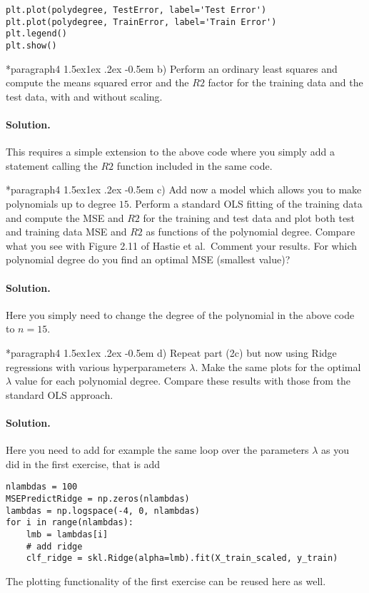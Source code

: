 \documentclass[%
oneside,                 %
final,                   %
10pt]{article}
\makeatletter
\newenvironment{doconceexercise}{}{}
\newcommand\subex{\@startsection*{paragraph}{4}{\z@}%
                  {1.5ex\@plus1ex \@minus.2ex}%
                  {-0.5em}%
                  {\normalfont\normalsize\bfseries}}
\makeatother
\begin{document}
\begin{doconceexercise}
\begin{verbatim}
plt.plot(polydegree, TestError, label='Test Error')
plt.plot(polydegree, TrainError, label='Train Error')
plt.legend()
plt.show()
\end{verbatim}


\subex{b)}
Perform an ordinary least squares and compute the means squared error and the $R2$ factor for the training data and the test data, with and without scaling.


\paragraph{Solution.}
This requires a simple extension to the above code where you simply add a statement calling the $R2$ function included in the same code.


\subex{c)}
Add now a model which allows you to make polynomials up to degree $15$.  Perform a standard OLS fitting of the training data and compute the MSE and $R2$ for the training and test data and plot both test and training data MSE and $R2$ as functions of the polynomial degree. Compare what you see with Figure 2.11 of Hastie et al.~Comment your results. For which polynomial degree do you find an optimal MSE (smallest value)?


\paragraph{Solution.}
Here you simply need to change the degree of the polynomial in the above code to $n=15$.


\subex{d)}
Repeat part (2c) but now using Ridge regressions with various hyperparameters $\lambda$. Make the same plots for the optimal $\lambda$ value for each polynomial degree. Compare these results with those from the standard OLS approach.


\paragraph{Solution.}
Here you need to add for example the same loop over the parameters $\lambda$ as you did in the first exercise, that is add
\begin{verbatim}
nlambdas = 100
MSEPredictRidge = np.zeros(nlambdas)
lambdas = np.logspace(-4, 0, nlambdas)
for i in range(nlambdas):
    lmb = lambdas[i]
    # add ridge
    clf_ridge = skl.Ridge(alpha=lmb).fit(X_train_scaled, y_train)

\end{verbatim}
The plotting functionality of the first exercise can be reused here as well.






\end{doconceexercise}


\end{document}
